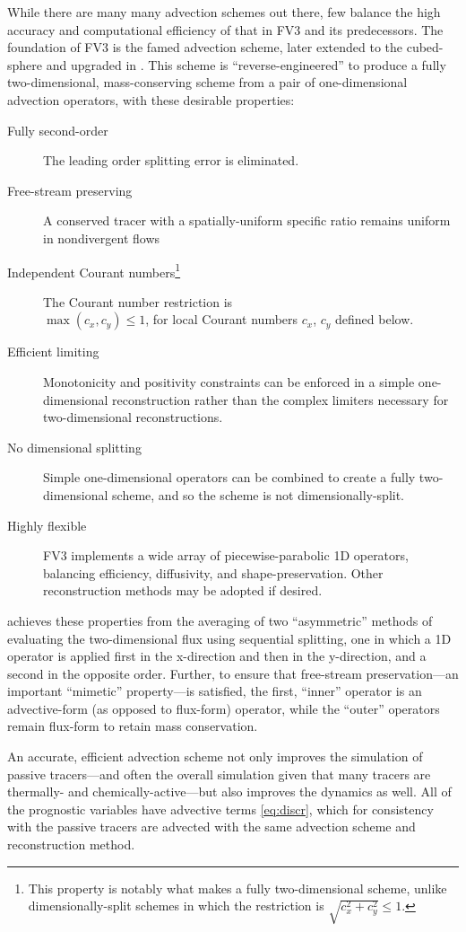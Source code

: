 \documentclass[10pt,letterpaper,margin=1in]{memoir}
\begin{document}
While there are many many advection schemes out there, few balance the high accuracy and computational efficiency of that in FV3 and its predecessors. The foundation of FV3 is the famed \citet{LR96} advection scheme, later extended to the cubed-sphere and upgraded in \citet{PL07}. This scheme is ``reverse-engineered'' to produce a fully two-dimensional, mass-conserving scheme from a pair of one-dimensional advection operators, with these desirable properties:
\begin{description}
	\item[Fully second-order] The leading order splitting error is eliminated.
	\item[Free-stream preserving] A conserved tracer with a spatially-uniform specific ratio remains uniform in nondivergent flows 
	\item[Independent Courant numbers\footnote{This property is notably what makes \citet{LR96} a fully two-dimensional scheme, unlike dimensionally-split schemes in which the restriction is $\sqrt{c_x^2 + c_y^2} \le 1$.} ]The Courant number restriction is \\ $\max \left ( c_x, c_y \right ) \le 1$, for local Courant numbers $c_x$, $c_y$ defined below.
	\item[Efficient limiting] Monotonicity and positivity constraints can be enforced in a simple one-dimensional reconstruction rather than the complex limiters necessary for two-dimensional reconstructions.
	\item[No dimensional splitting] Simple one-dimensional operators can be combined to create a fully two-dimensional scheme, and so the scheme is not dimensionally-split. 
	\item[Highly flexible] FV3 implements a wide array of piecewise-parabolic 1D operators, balancing efficiency, diffusivity, and shape-preservation. Other reconstruction methods may be adopted if desired.
\end{description}
\citet{LR96} achieves these properties from the averaging of two ``asymmetric'' methods of evaluating the two-dimensional flux using sequential splitting, one in which a 1D operator is applied first in the x-direction and then in the y-direction, and a second in the opposite order. Further, to ensure that free-stream preservation---an important ``mimetic'' property---is satisfied, the first, ``inner'' operator is an advective-form (as opposed to flux-form) operator, while the ``outer'' operators remain flux-form to retain mass conservation.

An accurate, efficient advection scheme not only improves the simulation of passive tracers---and often the overall simulation given that many tracers are thermally- and chemically-active---but also improves the dynamics as well. All of the prognostic variables have advective terms \eqref{eq:discr}, which for consistency with the passive tracers are advected with the same advection scheme and reconstruction method.
\end{document}
